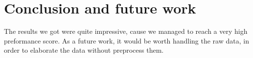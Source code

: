 \documentclass[a4paper,10pt,oneside]{article}
\begin{document}
\section{Conclusion and future work}
The results we got were quite impressive, cause we managed to reach a very high preformance score. 
As a future work, it would be worth handling the raw data, in order to elaborate the data without preprocess them.

\vspace{0.3cm}



\end{document}
